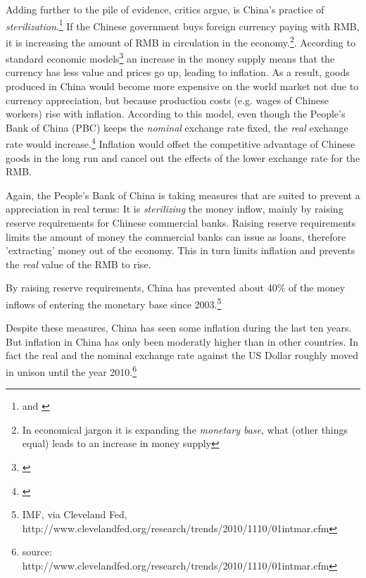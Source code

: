 Adding further to the pile of evidence, critics argue, is China's 
practice of \emph{sterilization}.\footnote{\cite{Humpage2010} and \cite[p. ?]{Wang2011}} If the Chinese government buys foreign 
currency paying with RMB, it is increasing the amount of RMB in 
circulation in the economy.\footnote{In economical jargon it is 
expanding the \emph{monetary base}, what (other things equal) leads to 
an increase in money supply}. According to standard economic 
models\footnote{\cite[pp. ?]{Krugman2008}} an increase in the money 
supply means that the currency has less value and prices go up, leading 
to inflation.%
As a result, goods produced in China would become more expensive on the 
world market not due to currency appreciation, but because production 
costs (e.g. wages of Chinese workers) rise with inflation. According to 
this model, even though the People's Bank of China (PBC) keeps the 
\emph{nominal} exchange rate fixed, the \emph{real} exchange rate would 
increase.\footnote{\cite[p. 509]{Krugman}} Inflation would offset the 
competitive advantage of Chinese goods in the long run and cancel out 
the effects of the lower exchange rate for the RMB.


Again, the People's Bank of China is taking measures that are suited to prevent a appreciation in real terms: It is \emph{sterilizing} the 
money inflow, mainly by raising reserve requirements for Chinese commercial banks. Raising reserve requirements limits the amount of money the commercial 
banks can issue as loans, therefore 'extracting' money out of the economy. This 
in turn limits inflation and prevents the \emph{real} value of the RMB to rise. 

By raising reserve requirements, China has prevented about 40\% of the money 
inflows of entering the monetary base since 2003.\footnote{IMF, via Cleveland Fed, 
http://www.clevelandfed.org/research/trends/2010/1110/01intmar.cfm}%

Despite these measures, China has seen some inflation during the last ten years. But inflation in China 
has only been moderatly higher than in other countries. In fact the real 
and the nominal exchange rate against the US Dollar roughly moved in unison until the year 2010.\footnote{source: 
http://www.clevelandfed.org/research/trends/2010/1110/01intmar.cfm}%

